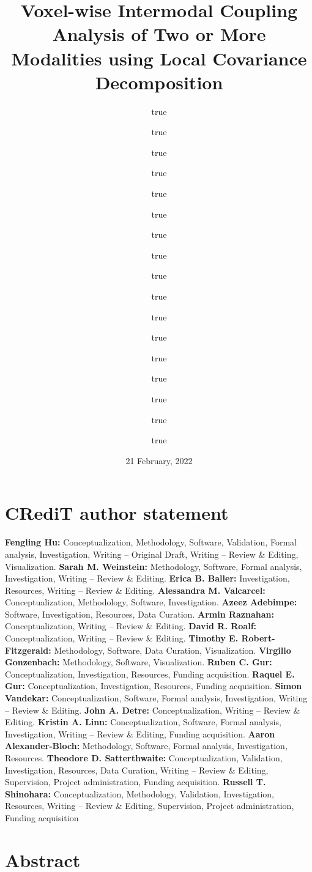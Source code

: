 \documentclass[
  12pt,
]{article}
\title{Voxel-wise Intermodal Coupling Analysis of Two or More Modalities using Local Covariance Decomposition}
\author{true \and true \and true \and true \and true \and true \and true \and true \and true \and true \and true \and true \and true \and true \and true \and true \and true}
\date{21 February, 2022}
\begin{document}
\maketitle

\hypertarget{credit-author-statement}{%
\section*{CRediT author statement}\label{credit-author-statement}}

\textbf{Fengling Hu:} Conceptualization, Methodology, Software, Validation, Formal analysis, Investigation, Writing -- Original Draft, Writing -- Review \& Editing, Visualization. \textbf{Sarah M. Weinstein:} Methodology, Software, Formal analysis, Investigation, Writing -- Review \& Editing. \textbf{Erica B. Baller:} Investigation, Resources, Writing -- Review \& Editing. \textbf{Alessandra M. Valcarcel:} Conceptualization, Methodology, Software, Investigation. \textbf{Azeez Adebimpe:} Software, Investigation, Resources, Data Curation. \textbf{Armin Raznahan:} Conceptualization, Writing -- Review \& Editing. \textbf{David R. Roalf:} Conceptualization, Writing -- Review \& Editing. \textbf{Timothy E. Robert-Fitzgerald:} Methodology, Software, Data Curation, Visualization. \textbf{Virgilio Gonzenbach:} Methodology, Software, Visualization. \textbf{Ruben C. Gur:} Conceptualization, Investigation, Resources, Funding acquisition. \textbf{Raquel E. Gur:} Conceptualization, Investigation, Resources, Funding acquisition. \textbf{Simon Vandekar:} Conceptualization, Software, Formal analysis, Investigation, Writing -- Review \& Editing. \textbf{John A. Detre:} Conceptualization, Writing -- Review \& Editing. \textbf{Kristin A. Linn:} Conceptualization, Software, Formal analysis, Investigation, Writing -- Review \& Editing, Funding acquisition. \textbf{Aaron Alexander-Bloch:} Methodology, Software, Formal analysis, Investigation, Resources. \textbf{Theodore D. Satterthwaite:} Conceptualization, Validation, Investigation, Resources, Data Curation, Writing -- Review \& Editing, Supervision, Project administration, Funding acquisition. \textbf{Russell T. Shinohara:} Conceptualization, Methodology, Validation, Investigation, Resources, Writing -- Review \& Editing, Supervision, Project administration, Funding acquisition

\newpage

\hypertarget{abstract}{%
\section*{Abstract}\label{abstract}}
\end{document}
